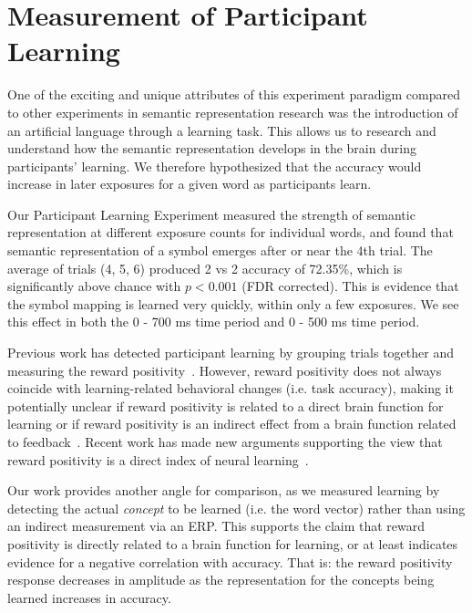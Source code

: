 \section{Measurement of Participant Learning}
\label{sec:discussion:participantlearning}

One of the exciting and unique attributes of this experiment paradigm compared 
to other experiments in semantic representation research was the introduction 
of an artificial language through a learning task. This allows us to research 
and understand how the semantic representation develops in the brain during 
participants' learning. We therefore hypothesized that the \tvt accuracy would 
increase in later exposures for a given word as participants learn.

Our Participant Learning Experiment measured the strength of semantic 
representation at different exposure counts for individual words, and found 
that semantic representation of a symbol emerges after or near the 4th trial.  
The average of trials (4, 5, 6) produced 2 vs 2 accuracy of 72.35\%, which is 
significantly above chance with $p < 0.001$ (FDR corrected). This is evidence 
that the symbol mapping is learned very quickly, within only a few exposures.  
We see this effect in both the 0 - 700 ms time period and 0 - 500 ms time 
period.

Previous work has detected participant learning by grouping trials together and 
measuring the reward positivity~\cite{krigolson2014we}. However, reward 
positivity does not always coincide with learning-related behavioral changes 
(i.e. task accuracy), making it potentially unclear if reward positivity is 
related to a direct brain function for learning or if reward positivity is an 
indirect effect from a brain function related to 
feedback~\cite{walsh2012learning}. Recent work has made new arguments 
supporting the view that reward positivity is a direct index of neural 
learning~\cite{williams2017application}. 

Our work provides another angle for comparison, as we measured learning by 
detecting the actual \emph{concept} to be learned (i.e. the word vector) rather 
than using an indirect measurement via an ERP. This supports the claim that 
reward positivity is directly related to a brain function for learning, or at 
least indicates evidence for a negative correlation with \tvt accuracy. That 
is: the reward positivity response decreases in amplitude as the representation 
for the concepts being learned increases in \tvt accuracy.

